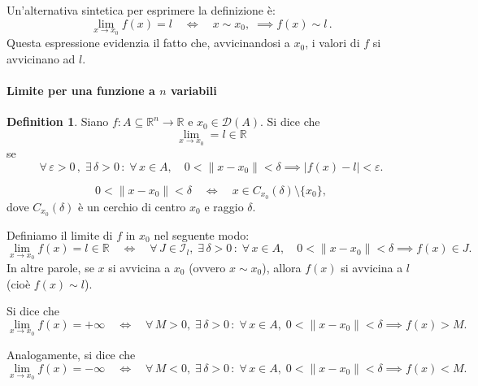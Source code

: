 \documentclass{article}
\theoremstyle{plain}
\theoremstyle{definition}
\newtheorem{defn}{Definition}[section]
\theoremstyle{remark}
\begin{document}
Un'alternativa sintetica per esprimere la definizione è:
\[
\lim_{x\to x_0} f(x)=l \quad \iff \quad x\sim x_0,\;\implies f(x)\sim l\,.
\]
Questa espressione evidenzia il fatto che, avvicinandosi a \(x_0\), i valori di \(f\) si avvicinano ad \(l\).

\vspace{10pt}

\paragraph{Limite per una funzione a $n$ variabili}
\begin{bxthm}
\begin{defn}
    Siano $f:A\subseteq\mathbb{R}^n\to\mathbb{R}$ e $x_0\in\mathcal{D}(A)$. 
    Si dice che 
    \[\lim_{x\to x_0}=l\in\mathbb{R}\]
    se 
    \[\forall\, \varepsilon>0\,,\; \exists\, \delta>0\,:\;\forall\, x\in A,\quad 0<\| x-x_0 \|<\delta\implies | f(x)-l |<\varepsilon.\]
\end{defn}
\end{bxthm}

\vspace{10pt}


\[
0 < \|x - x_0\| < \delta \quad \iff \quad x \in C_{x_0}(\delta) \setminus \{x_0\},
\]
dove \(C_{x_0}(\delta)\) è un cerchio di centro \(x_0\) e raggio \(\delta\).

Definiamo il limite di \(f\) in \(x_0\) nel seguente modo:
\[
\lim_{x\to x_0} f(x) = l \in \mathbb{R} \quad \iff \quad \forall\, J\in\mathcal{I}_l,\; \exists\, \delta > 0\,:\; \forall\, x \in A,\quad 0 < \|x - x_0\| < \delta\implies f(x) \in J.
\]
In altre parole, se \(x\) si avvicina a \(x_0\) (ovvero \(x \sim x_0\)), allora \(f(x)\) si avvicina a \(l\) (cioè \(f(x) \sim l\)).

Si dice che
\[
\lim_{x\to x_0} f(x) = +\infty \quad \iff \quad \forall\, M > 0,\; \exists\, \delta > 0\,:\;\forall\, x \in A,\; 0 < \|x - x_0\| < \delta\implies f(x) > M.
\]

Analogamente, si dice che
\[
\lim_{x\to x_0} f(x) = -\infty \quad \iff \quad \forall\, M < 0,\; \exists\, \delta > 0 \,:\; \forall\, x \in A,\; 0 < \|x - x_0\| < \delta\implies f(x) < M.
\]

\vspace{10pt}
\end{document}
